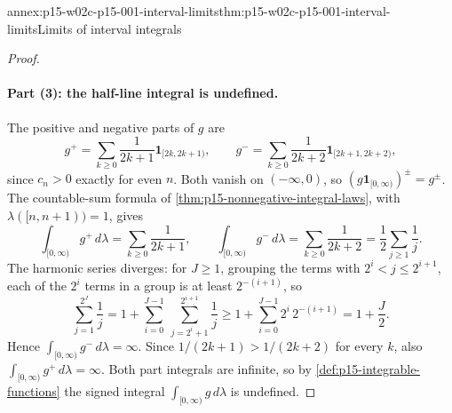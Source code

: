 \begin{annexitem}{annex:p15-w02c-p15-001-interval-limits}{thm:p15-w02c-p15-001-interval-limits}{Limits of interval integrals}
\begin{proof}
\paragraph{Part (3): the half-line integral is undefined.}
The positive and negative parts of \(g\) are
\[
 g^+=\sum_{k\geq0}\frac1{2k+1}\mathbf1_{[2k,2k+1)},\qquad
 g^-=\sum_{k\geq0}\frac1{2k+2}\mathbf1_{[2k+1,2k+2)} ,
\]
since \(c_n>0\) exactly for even \(n\). Both vanish on \((-\infty,0)\), so
\((g\mathbf1_{[0,\infty)})^\pm=g^\pm\). The countable-sum formula of
\cref{thm:p15-nonnegative-integral-laws}, with
\(\lambda([n,n+1))=1\), gives
\[
 \int_{[0,\infty)}g^+\,d\lambda=\sum_{k\geq0}\frac1{2k+1},\qquad
 \int_{[0,\infty)}g^-\,d\lambda=\sum_{k\geq0}\frac1{2k+2}
 =\frac12\sum_{j\geq1}\frac1j .
\]
The harmonic series diverges: for \(J\geq1\), grouping the terms with
\(2^i<j\leq2^{i+1}\), each of the \(2^i\) terms in a group is at least
\(2^{-(i+1)}\), so
\[
 \sum_{j=1}^{2^J}\frac1j
 =1+\sum_{i=0}^{J-1}\ \sum_{j=2^i+1}^{2^{i+1}}\frac1j
 \geq1+\sum_{i=0}^{J-1}2^i\,2^{-(i+1)}=1+\frac J2 .
\]
Hence \(\int_{[0,\infty)}g^-\,d\lambda=\infty\). Since
\(1/(2k+1)>1/(2k+2)\) for every \(k\), also
\(\int_{[0,\infty)}g^+\,d\lambda=\infty\). Both part integrals are infinite,
so by \cref{def:p15-integrable-functions} the signed integral
\(\int_{[0,\infty)}g\,d\lambda\) is undefined.
\end{proof}
\end{annexitem}

